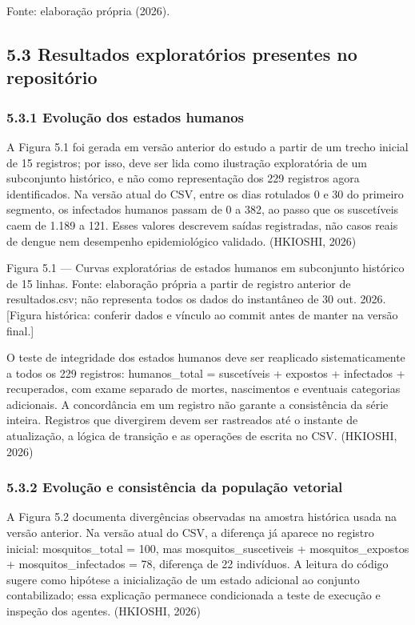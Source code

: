 Fonte: elaboração própria (2026).

\subsection{5.3 Resultados exploratórios presentes no
repositório}\label{resultados-exploratuxf3rios-presentes-no-reposituxf3rio}

\subsubsection{5.3.1 Evolução dos estados
humanos}\label{evoluuxe7uxe3o-dos-estados-humanos}

A Figura 5.1 foi gerada em versão anterior do estudo a partir de um
trecho inicial de 15 registros; por isso, deve ser lida como ilustração
exploratória de um subconjunto histórico, e não como representação dos
229 registros agora identificados. Na versão atual do CSV, entre os dias
rotulados 0 e 30 do primeiro segmento, os infectados humanos passam de 0
a 382, ao passo que os suscetíveis caem de 1.189 a 121. Esses valores
descrevem saídas registradas, não casos reais de dengue nem desempenho
epidemiológico validado. (HKIOSHI, 2026)

Figura 5.1 --- Curvas exploratórias de estados humanos em subconjunto
histórico de 15 linhas. Fonte: elaboração própria a partir de registro
anterior de resultados.csv; não representa todos os dados do instantâneo
de 30 out. 2026. {[}Figura histórica: conferir dados e vínculo ao commit
antes de manter na versão final.{]}

O teste de integridade dos estados humanos deve ser reaplicado
sistematicamente a todos os 229 registros: humanos\_total = suscetíveis
+ expostos + infectados + recuperados, com exame separado de mortes,
nascimentos e eventuais categorias adicionais. A concordância em um
registro não garante a consistência da série inteira. Registros que
divergirem devem ser rastreados até o instante de atualização, a lógica
de transição e as operações de escrita no CSV. (HKIOSHI, 2026)

\subsubsection{5.3.2 Evolução e consistência da população
vetorial}\label{evoluuxe7uxe3o-e-consistuxeancia-da-populauxe7uxe3o-vetorial}

A Figura 5.2 documenta divergências observadas na amostra histórica
usada na versão anterior. Na versão atual do CSV, a diferença já aparece
no registro inicial: mosquitos\_total = 100, mas mosquitos\_suscetiveis
+ mosquitos\_expostos + mosquitos\_infectados = 78, diferença de 22
indivíduos. A leitura do código sugere como hipótese a inicialização de
um estado adicional ao conjunto contabilizado; essa explicação permanece
condicionada a teste de execução e inspeção dos agentes. (HKIOSHI, 2026)

